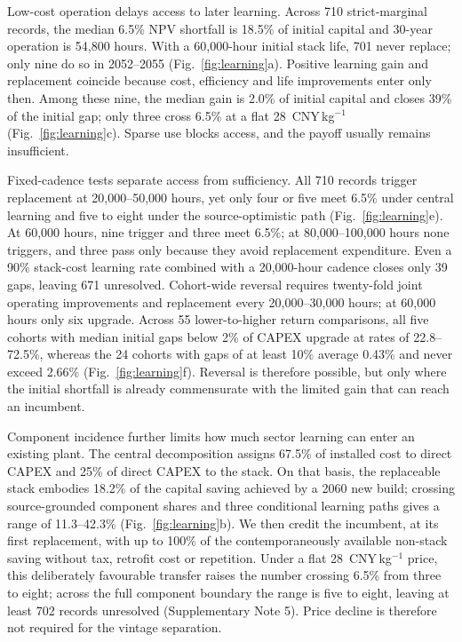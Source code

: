 \documentclass[11pt,a4paper]{article}
\newcommand{\cnykg}{CNY\,kg$^{-1}$}
\begin{document}
Low-cost operation delays access to later learning. Across 710 strict-marginal records, the median 6.5\% NPV shortfall is 18.5\% of initial capital and 30-year operation is 54,800 hours. With a 60,000-hour initial stack life, 701 never replace; only nine do so in 2052--2055 (Fig.~\ref{fig:learning}a). Positive learning gain and replacement coincide because cost, efficiency and life improvements enter only then. Among these nine, the median gain is 2.0\% of initial capital and closes 39\% of the initial gap; only three cross 6.5\% at a flat 28~\cnykg{} (Fig.~\ref{fig:learning}c). Sparse use blocks access, and the payoff usually remains insufficient.

Fixed-cadence tests separate access from sufficiency. All 710 records trigger replacement at 20,000--50,000 hours, yet only four or five meet 6.5\% under central learning and five to eight under the source-optimistic path (Fig.~\ref{fig:learning}e). At 60,000 hours, nine trigger and three meet 6.5\%; at 80,000--100,000 hours none triggers, and three pass only because they avoid replacement expenditure. Even a 90\% stack-cost learning rate combined with a 20,000-hour cadence closes only 39 gaps, leaving 671 unresolved. Cohort-wide reversal requires twenty-fold joint operating improvements and replacement every 20,000--30,000 hours; at 60,000 hours only six upgrade. Across 55 lower-to-higher return comparisons, all five cohorts with median initial gaps below 2\% of CAPEX upgrade at rates of 22.8--72.5\%, whereas the 24 cohorts with gaps of at least 10\% average 0.43\% and never exceed 2.66\% (Fig.~\ref{fig:learning}f). Reversal is therefore possible, but only where the initial shortfall is already commensurate with the limited gain that can reach an incumbent.

Component incidence further limits how much sector learning can enter an existing plant. The central decomposition assigns 67.5\% of installed cost to direct CAPEX and 25\% of direct CAPEX to the stack. On that basis, the replaceable stack embodies 18.2\% of the capital saving achieved by a 2060 new build; crossing source-grounded component shares and three conditional learning paths gives a range of 11.3--42.3\% (Fig.~\ref{fig:learning}b). We then credit the incumbent, at its first replacement, with up to 100\% of the contemporaneously available non-stack saving without tax, retrofit cost or repetition. Under a flat 28~\cnykg{} price, this deliberately favourable transfer raises the number crossing 6.5\% from three to eight; across the full component boundary the range is five to eight, leaving at least 702 records unresolved (Supplementary Note 5). Price decline is therefore not required for the vintage separation.
\end{document}
